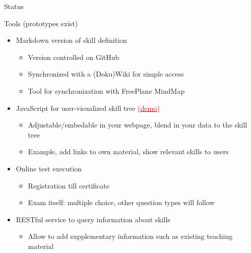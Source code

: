 \documentclass[compress,aspectratio=169]{beamer}
\newcommand{\hrefb}[2]{\href{#1}{\textcolor{red}{#2}}}
\begin{document}
\begin{frame}{Status}

\begin{block}{Tools (prototypes exist)}
  \begin{itemize}
    \item Markdown version of skill definition
      \begin{itemize}
        \item Version controlled on GitHub
        \item Synchronized with a (Doku)Wiki for simple access
        \item Tool for synchronization with FreePlane MindMap
      \end{itemize}
    \item JavaScript for user-visualized skill tree \hrefb{https://www.hpc-certification.org/skills/}{(demo)}
  		\begin{itemize}
  			\item Adjustable/embedable in your webpage, blend in your data to the skill tree
        \item Example, add links to own material, show relevant skills to users
      \end{itemize}
    \item Online test execution
      \begin{itemize}
        \item Registration till certificate
        \item Exam itself: multiple choice, other question types will follow
      \end{itemize}
    \item RESTful service to query information about skills
      \begin{itemize}
        \item Allow to add supplementary information such as existing teaching material
      \end{itemize}
  \end{itemize}
\end{block}

\end{frame}
\end{document}
